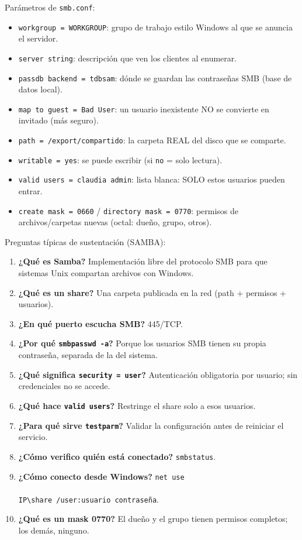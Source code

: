 Parámetros de \texttt{smb.conf}:
\begin{itemize}
  \item \texttt{workgroup = WORKGROUP}: grupo de trabajo estilo Windows al que se anuncia el servidor.
  \item \texttt{server string}: descripción que ven los clientes al enumerar.
  \item \texttt{passdb backend = tdbsam}: dónde se guardan las contraseñas SMB (base de datos local).
  \item \texttt{map to guest = Bad User}: un usuario inexistente NO se convierte en invitado (más seguro).
  \item \texttt{path = /export/compartido}: la carpeta REAL del disco que se comparte.
  \item \texttt{writable = yes}: se puede escribir (si \texttt{no} = solo lectura).
  \item \texttt{valid users = claudia admin}: lista blanca: SOLO estos usuarios pueden entrar.
  \item \texttt{create mask = 0660} / \texttt{directory mask = 0770}: permisos de archivos/carpetas nuevas (octal: dueño, grupo, otros).
\end{itemize}

Preguntas típicas de sustentación (SAMBA):
\begin{enumerate}
  \item \textbf{¿Qué es Samba?} Implementación libre del protocolo SMB para que sistemas Unix compartan archivos con Windows.
  \item \textbf{¿Qué es un share?} Una carpeta publicada en la red (path + permisos + usuarios).
  \item \textbf{¿En qué puerto escucha SMB?} 445/TCP.
  \item \textbf{¿Por qué \texttt{smbpasswd -a}?} Porque los usuarios SMB tienen su propia contraseña, separada de la del sistema.
  \item \textbf{¿Qué significa \texttt{security = user}?} Autenticación obligatoria por usuario; sin credenciales no se accede.
  \item \textbf{¿Qué hace \texttt{valid users}?} Restringe el share solo a esos usuarios.
  \item \textbf{¿Para qué sirve \texttt{testparm}?} Validar la configuración antes de reiniciar el servicio.
  \item \textbf{¿Cómo verifico quién está conectado?} \texttt{smbstatus}.
  \item \textbf{¿Cómo conecto desde Windows?} \texttt{net use \\\\IP\textbackslash share /user:usuario contraseña}.
  \item \textbf{¿Qué es un mask 0770?} El dueño y el grupo tienen permisos completos; los demás, ninguno.
\end{enumerate}
